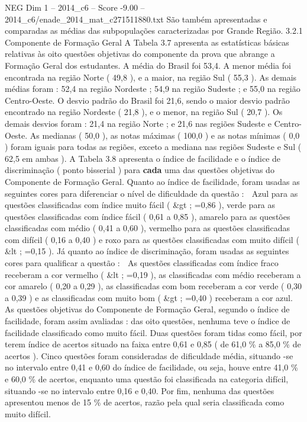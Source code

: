 \begin{textsample}{NEG Dim 1 – 2014\_c6 – Score -9.00 – 2014\_c6/enade\_2014\_mat\_c271511880.txt}
São também apresentadas e comparadas as médias das subpopulações caracterizadas por Grande Região. 3.2.1 Componente de Formação Geral A Tabela 3.7 apresenta as estatísticas básicas relativas às oito questões objetivas do componente da prova que abrange a Formação Geral dos estudantes.
A média do Brasil foi 53,4.
A menor média foi encontrada na região Norte ( 49,8 ), e a maior, na região Sul ( 55,3 ).
As demais médias foram : 52,4 na região Nordeste ; 54,9 na região Sudeste ; e 55,0 na região Centro-Oeste.
O desvio padrão do Brasil foi 21,6, sendo o maior desvio padrão encontrado na região Nordeste ( 21,8 ), e o menor, na região Sul ( 20,7 ).
Os demais desvios foram : 21,4 na região Norte ; e 21,6 nas regiões Sudeste e Centro-Oeste.
As medianas ( 50,0 ), as notas máximas ( 100,0 ) e as notas mínimas ( 0,0 ) foram iguais para todas as regiões, exceto a mediana nas regiões Sudeste e Sul ( 62,5 em ambas ).
A Tabela 3.8 apresenta o índice de facilidade e o índice de discriminação ( ponto bisserial ) para \textbf{cada} uma das questões objetivas do Componente de Formação Geral.
Quanto ao índice de facilidade, foram usadas as seguintes cores para diferenciar o nível de dificuldade da questão :  Azul para as questões classificadas com índice muito fácil ( \&gt ; =0,86 ), verde para as questões classificadas com índice fácil ( 0,61 a 0,85 ), amarelo para as questões classificadas com médio ( 0,41 a 0,60 ), vermelho para as questões classificadas com difícil ( 0,16 a 0,40 ) e roxo para as questões classificadas com muito difícil ( \&lt ; =0,15 ).
Já quanto ao índice de discriminação, foram usadas as seguintes cores para qualificar a questão :  As questões classificadas com índice fraco receberam a cor vermelho ( \&lt ; =0,19 ), as classificadas com médio receberam a cor amarelo ( 0,20 a 0,29 ), as classificadas com bom receberam a cor verde ( 0,30 a 0,39 ) e as classificadas com muito bom ( \&gt ; =0,40 ) receberam a cor azul.
As questões objetivas do Componente de Formação Geral, segundo o índice de facilidade, foram assim avaliadas : das oito questões, nenhuma teve o índice de facilidade classificado como muito fácil.
Duas questões foram tidas como fácil, por terem índice de acertos situado na faixa entre 0,61 e 0,85 ( de 61,0 \% a 85,0 \% de acertos ).
Cinco questões foram consideradas de dificuldade média, situando -se no intervalo entre 0,41 e 0,60 do índice de facilidade, ou seja, houve entre 41,0 \% e 60,0 \% de acertos, enquanto uma questão foi classificada na categoria difícil, situando -se no intervalo entre 0,16 e 0,40.
Por fim, nenhuma das questões apresentou menos de 15 \% de acertos, razão pela qual seria classificada como muito difícil.

\end{textsample}
